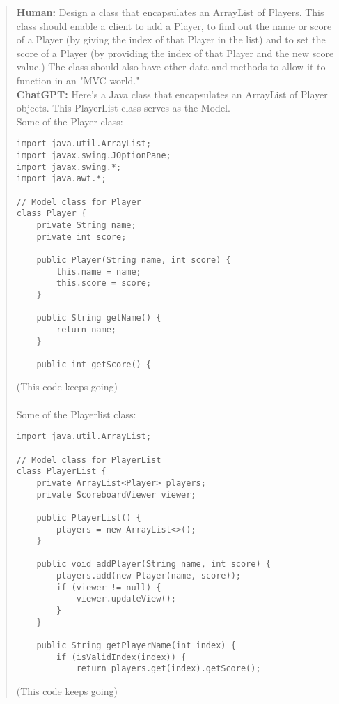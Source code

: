 \documentclass[a4paper,11pt]{article}
\begin{document}
\begin{quote}
\textbf{Human:} Design a class that encapsulates an ArrayList of Players. This class should enable a client to add a Player, to find out the name or score of a Player (by giving the index of that Player in the list) and to set the score of a Player (by providing the index of that Player and the new score value.) The class should also have other data and methods to allow it to function in an "MVC world." \\
\textbf{ChatGPT:} Here's a Java class that encapsulates an ArrayList of Player objects. This PlayerList class serves as the Model.  \\

Some of the Player class:
\begin{lstlisting}
import java.util.ArrayList;
import javax.swing.JOptionPane;
import javax.swing.*;
import java.awt.*;

// Model class for Player
class Player {
    private String name;
    private int score;

    public Player(String name, int score) {
        this.name = name;
        this.score = score;
    }

    public String getName() {
        return name;
    }

    public int getScore() {

\end{lstlisting} (This code keeps going) \\\\
Some of the Playerlist class: \begin{lstlisting}
import java.util.ArrayList;

// Model class for PlayerList
class PlayerList {
    private ArrayList<Player> players;
    private ScoreboardViewer viewer;

    public PlayerList() {
        players = new ArrayList<>();
    }

    public void addPlayer(String name, int score) {
        players.add(new Player(name, score));
        if (viewer != null) {
            viewer.updateView();
        }
    }

    public String getPlayerName(int index) {
        if (isValidIndex(index)) {
            return players.get(index).getScore();
\end{lstlisting}
(This code keeps going)
\end{quote}
\end{document}
